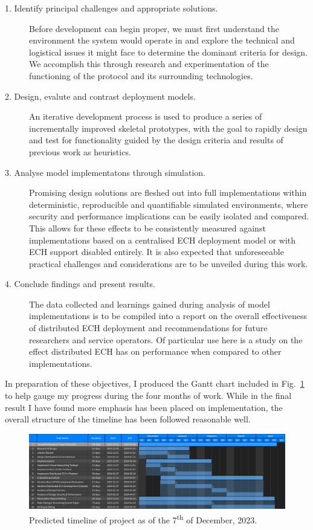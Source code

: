 \begin{description}
	\item[1. Identify principal challenges and appropriate solutions.] Before development can begin proper, we must first understand the environment the system would operate in and explore the technical and logistical issues it might face to determine the dominant criteria for design. We accomplish this through research and experimentation of the functioning of the protocol and its surrounding technologies.
	\item[2. Design, evalute and contrast deployment models.] An iterative development process is used to produce a series of incrementally improved skeletal prototypes, with the goal to rapidly design and test for functionality guided by the design criteria and results of previous work as heuristics.
	\item[3. Analyse model implementatons through simulation.] Promising design solutions are fleshed out into full implementations within deterministic, reproducible and quantifiable simulated environments, where security and performance implications can be easily isolated and compared. This allows for these effects to be consistently measured against implementations based on a centralised ECH deployment model or with ECH support disabled entirely. It is also expected that unforeseeable practical challenges and considerations are to be unveiled during this work.
	\item[4. Conclude findings and present results.] The data collected and learnings gained during analysis of model implementations is to be compiled into a report on the overall effectiveness of distributed ECH deployment and recommendations for future researchers and service operators. Of particular use here is a study on the effect distributed ECH has on performance when compared to other implementations.
\end{description}

In preparation of these objectives, I produced the Gantt chart included in Fig.~\ref{gantt_chart_figure} to help gauge my progress during the four months of work. While in the final result I have found more emphasis has been placed on implementation, the overall structure of the timeline has been followed reasonable well.

\begin{figure}[ht]
\centerline{\includegraphics[width=160mm]{images/gantt.png}}
\caption[Project timeline]{Predicted timeline of project as of the 7\textsuperscript{th} of December, 2023.}
\label{gantt_chart_figure}
\end{figure}









